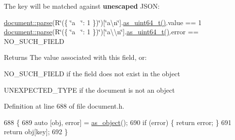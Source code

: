 The key will be matched against {\bfseries unescaped} J\+S\+ON\+:

\hyperlink{classsimdjson_1_1document_a6f11cda7c4a06fffdc00fdc97d98ae2b}{document\+::parse}(R\char`\"{}(\{ \char`\"{}a~\newline
\char`\"{}\+: 1 \})\char`\"{})\mbox{[}\char`\"{}a\textbackslash{}n\char`\"{}\mbox{]}.\hyperlink{classsimdjson_1_1document_1_1element_ab89d449ae4c78aced06643d7323cbdfb}{as\+\_\+uint64\+\_\+t()}.value == 1 \hyperlink{classsimdjson_1_1document_a6f11cda7c4a06fffdc00fdc97d98ae2b}{document\+::parse}(R\char`\"{}(\{ \char`\"{}a~\newline
\char`\"{}\+: 1 \})\char`\"{})\mbox{[}\char`\"{}a\textbackslash{}\textbackslash{}n\char`\"{}\mbox{]}.\hyperlink{classsimdjson_1_1document_1_1element_ab89d449ae4c78aced06643d7323cbdfb}{as\+\_\+uint64\+\_\+t()}.error == N\+O\+\_\+\+S\+U\+C\+H\+\_\+\+F\+I\+E\+LD

\begin{DoxyReturn}{Returns}
The value associated with this field, or\+:
\begin{DoxyItemize}
\item N\+O\+\_\+\+S\+U\+C\+H\+\_\+\+F\+I\+E\+LD if the field does not exist in the object
\item U\+N\+E\+X\+P\+E\+C\+T\+E\+D\+\_\+\+T\+Y\+PE if the document is not an object 
\end{DoxyItemize}
\end{DoxyReturn}


Definition at line 688 of file document.\+h.


\begin{DoxyCode}
688                                                                                                            
              \{
689   \textcolor{keyword}{auto} [obj, error] = \hyperlink{classsimdjson_1_1document_1_1element_a1fe44151506bca67f318f9f4aeb02fc6}{as\_object}();
690   \textcolor{keywordflow}{if} (error) \{ \textcolor{keywordflow}{return} error; \}
691   \textcolor{keywordflow}{return} obj[key];
692 \}
\end{DoxyCode}
\mbox{\label{classsimdjson_1_1document_1_1element_a1e7407d751420bcd130d90d838034492}} 
